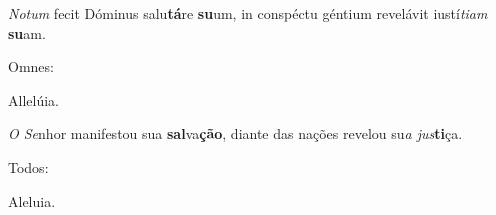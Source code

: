 \begin{greenumerate}
  \setcounter{enumi}{1}


  \item \textit{Notum} fecit Dóminus salu\textbf{tá}re \textbf{su}um, {\GreStar} in conspéctu géntium revelávit iustí\textit{tiam} \textbf{su}am. \begin{rubrica}Omnes:\end{rubrica} Allelúia.

  \switchcolumn\setcounter{enumi}{1}

  \item \textit{O Se}nhor manifestou sua \textbf{sal}va\textbf{ção}, {\GreStar} diante das nações revelou su\textit{a jus}\textbf{ti}ça. \begin{rubrica}Todos:\end{rubrica} Aleluia.
\end{greenumerate}